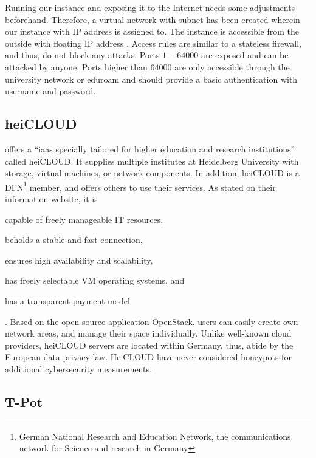Running our instance and exposing it to the Internet needs some adjustments beforehand.
Therefore, a virtual network with subnet  has been created wherein our instance with IP address  is assigned to.
The instance is accessible from the outside with floating IP address .
Access rules are similar to a stateless firewall, and thus, do not block any attacks.
Ports $1-64000$ are exposed and can be attacked by anyone.
Ports higher than $64000$ are only accessible through the university network  or eduroam  and should provide a basic authentication with username and password.

\subsection{heiCLOUD}
\label{subsec:heicloud}

\citet{urz2021} offers a \enquote{\ac{iaas} specially tailored for higher education and research institutions} called heiCLOUD.
It supplies multiple institutes at Heidelberg University with storage, virtual machines, or network components.
In addition, heiCLOUD is a DFN\footnote{German National Research and Education Network, the communications network for Science and research in Germany} member, and offers others to use their services.
As stated on their information website\cite{heicloud2021}, it is
\begin{enumerate*}[label=(\roman*)]
    \item capable of freely manageable IT resources,
    \item beholds a stable and fast connection,
    \item ensures high availability and scalability,
    \item has freely selectable VM operating systems, and
    \item has a transparent payment model
\end{enumerate*} \cite{heicloud2021}.
Based on the open source application OpenStack, users can easily create own network areas, and manage their space individually.
Unlike well-known cloud providers, heiCLOUD servers are located within Germany, thus, abide by the European data privacy law.
HeiCLOUD have never considered honeypots for additional cybersecurity measurements.

\subsection{T-Pot}
\label{subsec:tpot}

